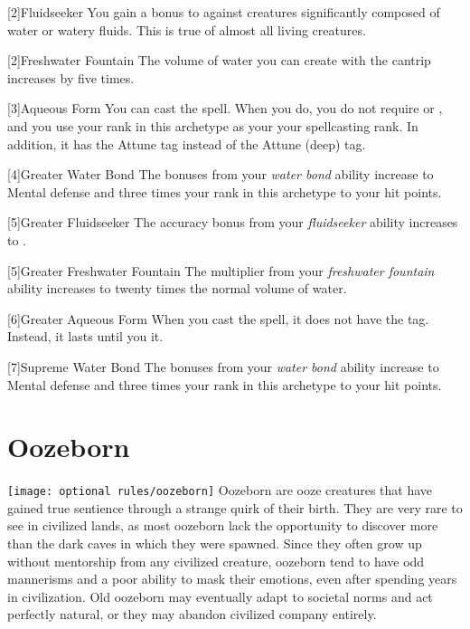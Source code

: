        [2]{Fluidseeker} You gain a  bonus to  against creatures significantly composed of water or watery fluids.
        This is true of almost all living creatures.

        [2]{Freshwater Fountain} The volume of water you can create with the  cantrip increases by five times.

        [3]{Aqueous Form} You can cast the  spell.
        When you do, you do not require  or , and you use your rank in this archetype as your your spellcasting rank.
        In addition, it has the Attune tag instead of the Attune (deep) tag.

        [4]{Greater Water Bond} The bonuses from your \textit{water bond} ability increase to  Mental defense and three times your rank in this archetype to your hit points.

        [5]{Greater Fluidseeker} The accuracy bonus from your \textit{fluidseeker} ability increases to .

        [5]{Greater Freshwater Fountain} The multiplier from your \textit{freshwater fountain} ability increases to twenty times the normal volume of water.

        [6]{Greater Aqueous Form} When you cast the  spell, it does not have the  tag.
        Instead, it lasts until you  it.

        [7]{Supreme Water Bond} The bonuses from your \textit{water bond} ability increase to  Mental defense and three times your rank in this archetype to your hit points.

\section{Oozeborn}
    \texttt{[image: optional rules/oozeborn]}
    Oozeborn are ooze creatures that have gained true sentience through a strange quirk of their birth.
    They are very rare to see in civilized lands, as most oozeborn lack the opportunity to discover more than the dark caves in which they were spawned.
    Since they often grow up without mentorship from any civilized creature, oozeborn tend to have odd mannerisms and a poor ability to mask their emotions, even after spending years in civilization.
    Old oozeborn may eventually adapt to societal norms and act perfectly natural, or they may abandon civilized company entirely.

